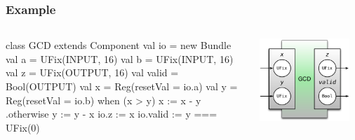 \documentclass[xcolor=pdflatex,dvipsnames,table]{beamer}
\begin{document}
\begin{frame}[fragile]
\frametitle{Example}
\begin{columns}


\begin{footnotesize}
\begin{scala}
class GCD extends Component {
  val io = new Bundle {
    val a     = UFix(INPUT, 16)
    val b     = UFix(INPUT, 16)
    val z     = UFix(OUTPUT, 16)
    val valid = Bool(OUTPUT) }
  val x = Reg(resetVal = io.a)
  val y = Reg(resetVal = io.b)
  when (x > y) {
    x := x - y
  } .otherwise {
    y := y - x
  }
  io.z     := x
  io.valid := y === UFix(0)
}
\end{scala}
\end{footnotesize}


\begin{center}
\includegraphics[width=0.9\textwidth]{../../bootcamp/figs/gcd.pdf} 
\end{center}

\end{columns}
\end{frame}
\end{document}
